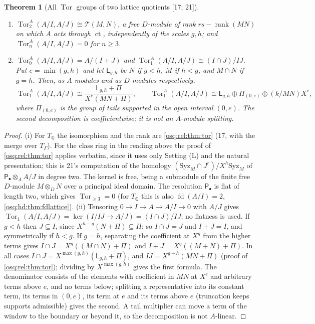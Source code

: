 \documentclass[11pt,letterpaper]{article}
\numberwithin{equation}{section}
\newtheorem{theorem}{Theorem}[section]
\theoremstyle{definition}
\theoremstyle{remark}
\theoremstyle{plain}
\newcommand{\Q}{\mathbb Q}
\newcommand{\ct}{\operatorname{ct}}
\newcommand{\Tor}{\operatorname{Tor}}
\newcommand{\fd}{\operatorname{fd}}
\newcommand{\rk}{\operatorname{rank}}
\newcommand{\src}[1]{\textup{\textsf{[#1]}}}
\begin{document}
\begin{theorem}[All $\Tor$ groups of two lattice quotients \src{17; 21}]\label{osq:da:thm:pair}
\leavevmode
\begin{enumerate}
\item $\Tor^A_2(A/I,A/J)\cong\mathcal T(M,N)$, a free $D$-module of rank $rs-\rk(MN)$ on which $A$ acts through $\ct$, independently of the
scales $g,h$; and $\Tor^A_n(A/I,A/J)=0$ for $n\ge3$.
\item $\Tor^A_0(A/I,A/J)=A/(I+J)$ and $\Tor^A_1(A/I,A/J)\cong(I\cap J)/IJ$. Put $e=\min(g,h)$ and let $\mathsf L_{g,h}$ be $N$ if $g<h$, $M$
if $h<g$, and $M\cap N$ if $g=h$. Then, as $A$-modules and as $D$-modules respectively,
\[
 \Tor^A_1(A/I,A/J)\cong\frac{\mathsf L_{g,h}+\Pi}{X^e(MN+\Pi)},\qquad
 \Tor^A_1(A/I,A/J)\cong\mathsf L_{g,h}\oplus\Pi_{(0,e)}\oplus(k/MN)X^e,
\]
where $\Pi_{(0,e)}$ is the group of tails supported in the open interval $(0,e)$. The second decomposition is coefficientwise; it is not
an $A$-module splitting.
\end{enumerate}
\end{theorem}
\begin{proof}
(i) For $T_\Q$ the isomorphism and the rank are \cref{osq:rel:thm:tor} (17, with the merge over $T_\Gamma$). For the class ring in the reading
above the proof of \cref{osq:rel:thm:tor} applies verbatim, since it uses only Setting (L) and the natural presentation; this is 21's
computation of the homology $(\mathrm{Syz}_M\cap J^r)/X^h\mathrm{Syz}_M$ of $\mathsf P_\bullet\otimes_AA/J$ in degree two. The kernel is free, being a
submodule of the finite free $D$-module $M\otimes_DN$ over a principal ideal domain. The resolution $\mathsf P_\bullet$ is flat of length two, which
gives $\Tor_{\ge3}=0$ (for $T_\Q$ this is also $\fd(A/I)=2$, \cref{osq:hd:thm:fdlattice}).
(ii) Tensoring $0\to I\to A\to A/I\to0$ with $A/J$ gives $\Tor_1(A/I,A/J)=\ker(I/IJ\to A/J)=(I\cap J)/IJ$; no flatness is used. If $g<h$ then
$J\subseteq I$, since $X^{h-g}(N+\Pi)\subseteq\Pi$; so $I\cap J=J$ and $I+J=I$, and symmetrically if $h<g$. If $g=h$, separating the
coefficient at $X^g$ from the higher terms gives $I\cap J=X^g((M\cap N)+\Pi)$ and $I+J=X^g((M+N)+\Pi)$. In all cases
$I\cap J=X^{\max(g,h)}(\mathsf L_{g,h}+\Pi)$, and $IJ=X^{g+h}(MN+\Pi)$ (proof of \cref{osq:rel:thm:tor}); dividing by $X^{\max(g,h)}$ gives
the first formula. The denominator consists of the elements with coefficient in $MN$ at $X^e$ and arbitrary terms above $e$, and no terms
below; splitting a representative into its constant term, its terms in $(0,e)$, its term at $e$ and its terms above $e$ (truncation keeps
supports admissible) gives the second. A tail multiplier can move a term of the window to the boundary or beyond it, so the decomposition is
not $A$-linear.
\end{proof}
\end{document}
